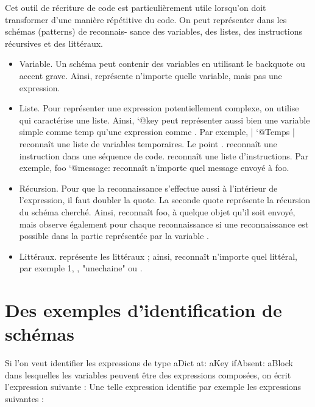 \documentclass[a4paper,10pt,twoside]{book}
\begin{document}
Cet outil de r\'ecriture de code est particuli\`erement utile lorsqu'on
doit transformer d'une mani\`ere r\'ep\'etitive du code. On peut repr\'esenter
dans les sch\'emas (patterns) de reconnais- sance des variables, des
listes, des instructions r\'ecursives et des litt\'eraux.

\begin{itemize}
\item	Variable. Un sch\'ema peut contenir des variables en utilisant
  le backquote ou accent grave. Ainsi,  repr\'esente n'importe
  quelle variable, mais pas une expression.

\item Liste. Pour repr\'esenter une expression potentiellement
  complexe, on utilise  qui caract\'erise une liste. Ainsi, `@key
  peut repr\'esenter aussi bien une variable simple comme temp qu'une
  expression comme . Par exemple, | `@Temps
  | reconnaît une liste de variables temporaires. Le point . reconnaît
  une instruction dans une s\'equence de code.
  reconnaît une liste d'instructions. Par exemple, foo `@message:
   reconnaît n'importe quel message envoy\'e à foo.


\item R\'ecursion. Pour que la reconnaissance s'effectue aussi à
  l'int\'erieur de l'expression, il faut doubler la quote. La seconde
  quote repr\'esente la r\'ecursion du sch\'ema cherch\'e. Ainsi,
   reconnaît foo, à quelque objet qu'il soit envoy\'e,
  mais observe \'egalement pour chaque reconnaissance si une
  reconnaissance est possible dans la partie repr\'esent\'ee par la
  variable .

\item	Litt\'eraux. \ct{\\#} repr\'esente les litt\'eraux ; ainsi, 
  reconnaît n'importe quel litt\'eral, par exemple 1, \ct{\\#()}, "unechaine"
  ou .
\end{itemize}

\section{Des exemples d'identification de sch\'emas}

Si l'on veut identifier les expressions de type
aDict at: aKey ifAbsent: aBlock dans lesquelles les variables peuvent être des expressions compos\'ees, on \'ecrit l'expression
suivante :
Une telle expression identifie par exemple les expressions suivantes :
\end{document}
